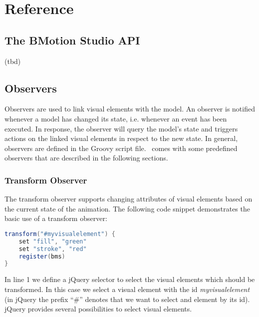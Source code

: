\chapter{Reference}
\label{reference}

\section{The BMotion Studio API}
\label{sec:bmsapi}

(tbd)

\section{Observers}
\label{sec:observers}

Observers are used to link visual elements with the model. 
An observer is notified whenever a model has changed its state, i.e. whenever an event has been executed. 
In response, the observer will query the model's state and triggers actions on the linked visual elements in respect to the new state. 
In general, observers are defined in the Groovy script file.
\bms~comes with some predefined observers that are described in the following sections.

\subsection{Transform Observer}
\label{sec:transform_observer}

The transform observer supports changing attributes of visual elements based on the current state of the animation.
The following code snippet demonstrates the basic use of a transform observer:

\begin{lstlisting}[float=ht,language=Groovy]
transform("#myvisualelement") {
    set "fill", "green"
    set "stroke", "red"
    register(bms)
}
\end{lstlisting}

In line 1 we define a jQuery selector to select the visual elements which should be transformed.
In this case we select a visual element with the id \textit{myvisualelement} (in jQuery the prefix ``\#'' denotes that we want to select and element by its id).
jQuery provides several possibilities to select visual elements.


